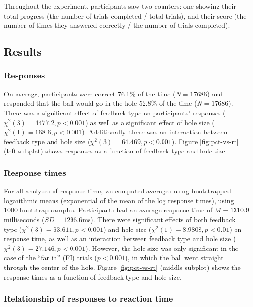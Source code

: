 \documentclass[10pt,letterpaper]{article}
\begin{document}
Throughout the experiment, participants saw two counters: one showing their total progress (the number of trials completed / total trials), and their score (the number of times they answered correctly / the number of trials completed).

\subsection{Results}

\subsubsection{Responses}

On average, participants were correct 76.1\% of the time ($N=17686$) and responded that the ball would go in the hole 52.8\% of the time ($N=17686$). There was a significant effect of feedback type on participants' responses ($\chi^2(3)=4477.2, p<0.001$) as well as a significant effect of hole size ($\chi^2(1)=168.6, p<0.001$). Additionally, there was an interaction between feedback type and hole size ($\chi^2(3)=64.469, p<0.001$). Figure \ref{fig:pct-vs-rt} (left subplot) shows responses as a function of feedback type and hole size.

\subsubsection{Response times}

For all analyses of response time, we computed averages using bootstrapped logarithmic means (exponential of the mean of the log response times), using 1000 bootstrap samples. Participants had an average response time of $M=1310.9$ milliseconds ($SD=1296.6$ms). There were significant effects of both feedback type ($\chi^2(3)=63.611, p<0.001$) and hole size ($\chi^2(1)=8.9808, p<0.01$) on response time, as well as an interaction between feedback type and hole size ($\chi^2(3)=27.146, p<0.001$). However, the hole size was only significant in the case of the ``far in'' (FI) trials ($p<0.001$), in which the ball went straight through the center of the hole. Figure \ref{fig:pct-vs-rt} (middle subplot) shows the response times as a function of feedback type and hole size.

\subsubsection{Relationship of responses to reaction time}
\end{document}
